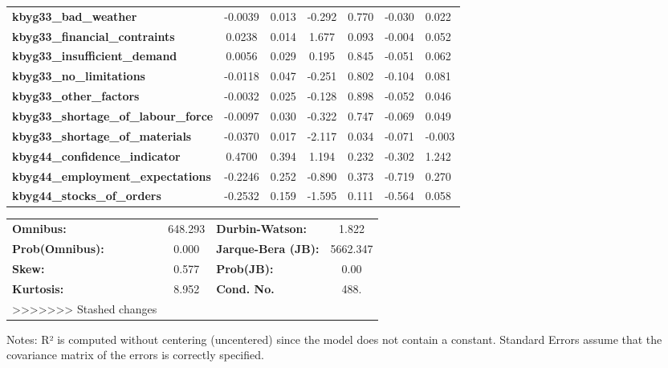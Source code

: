 \begin{center}
\begin{tabular}{lclc}
\textbf{kbyg33\_bad\_weather}                &      -0.0039  &        0.013     &    -0.292  &         0.770        &       -0.030    &        0.022     \\
\textbf{kbyg33\_financial\_contraints}       &       0.0238  &        0.014     &     1.677  &         0.093        &       -0.004    &        0.052     \\
\textbf{kbyg33\_insufficient\_demand}        &       0.0056  &        0.029     &     0.195  &         0.845        &       -0.051    &        0.062     \\
\textbf{kbyg33\_no\_limitations}             &      -0.0118  &        0.047     &    -0.251  &         0.802        &       -0.104    &        0.081     \\
\textbf{kbyg33\_other\_factors}              &      -0.0032  &        0.025     &    -0.128  &         0.898        &       -0.052    &        0.046     \\
\textbf{kbyg33\_shortage\_of\_labour\_force} &      -0.0097  &        0.030     &    -0.322  &         0.747        &       -0.069    &        0.049     \\
\textbf{kbyg33\_shortage\_of\_materials}     &      -0.0370  &        0.017     &    -2.117  &         0.034        &       -0.071    &       -0.003     \\
\textbf{kbyg44\_confidence\_indicator}       &       0.4700  &        0.394     &     1.194  &         0.232        &       -0.302    &        1.242     \\
\textbf{kbyg44\_employment\_expectations}    &      -0.2246  &        0.252     &    -0.890  &         0.373        &       -0.719    &        0.270     \\
\textbf{kbyg44\_stocks\_of\_orders}          &      -0.2532  &        0.159     &    -1.595  &         0.111        &       -0.564    &        0.058     \\
\bottomrule
\end{tabular}
\begin{tabular}{lclc}
\textbf{Omnibus:}       & 648.293 & \textbf{  Durbin-Watson:     } &    1.822  \\
\textbf{Prob(Omnibus):} &   0.000 & \textbf{  Jarque-Bera (JB):  } & 5662.347  \\
\textbf{Skew:}          &   0.577 & \textbf{  Prob(JB):          } &     0.00  \\
\textbf{Kurtosis:}      &   8.952 & \textbf{  Cond. No.          } &     488.  \\
>>>>>>> Stashed changes
\bottomrule
\end{tabular}
\end{center}

Notes: \newline
 [1] R² is computed without centering (uncentered) since the model does not contain a constant. \newline
 [2] Standard Errors assume that the covariance matrix of the errors is correctly specified.